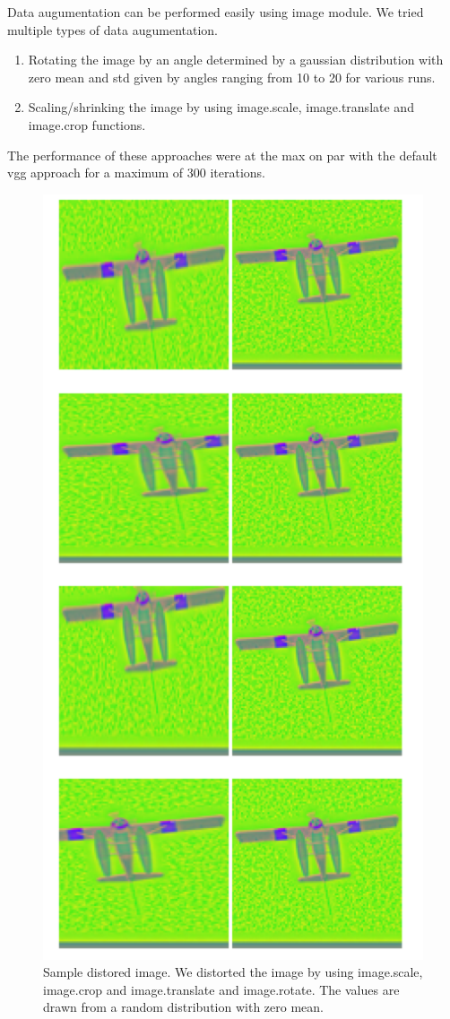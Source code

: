 \documentclass{article}
\begin{document}
Data augumentation can be performed easily using image module.  We tried multiple types of data augumentation.
\begin{enumerate}
  \item Rotating the image by an angle determined by a gaussian distribution with zero mean and std given by angles ranging from 10 to 20 for various runs.
  \item Scaling/shrinking the image by using image.scale, image.translate and image.crop functions.
\end{enumerate}
The performance of these approaches were at the max on par with the default vgg approach for a maximum of 300 iterations.

\begin{figure}[ht!]
  \centering
  \includegraphics{images/ImageDistortion}
  \caption{Sample distored image.  We distorted the image by using image.scale, image.crop and image.translate and image.rotate.  The values are drawn from a random distribution with zero mean.}
\end{figure}
\end{document}
